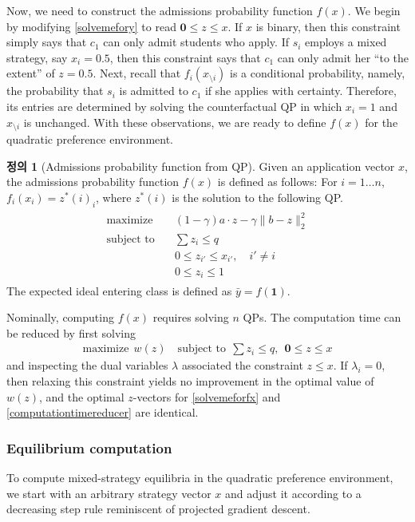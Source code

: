 \documentclass[12pt]{article} %
\theoremstyle{definition}
\newtheorem{definition}{Definition}
\theoremstyle{definition}
\newtheorem{definition}{정의}
\begin{document}
Now, we need to construct the admissions probability function $f(x)$. We begin by modifying \eqref{solvemefory} to read $\mathbf{0} \leq z \leq x$. If $x$ is binary, then this constraint simply says that $c_1$ can only admit students who apply. If $s_i$ employs a mixed strategy, say $x_i = 0.5$, then this constraint says that $c_1$ can only admit her ``to the extent'' of $z = 0.5$. Next, recall that $f_i(x_{\setminus i})$ is a conditional probability, namely, the probability that $s_i$ is admitted to $c_1$ if she applies with certainty. Therefore, its entries are determined by solving the counterfactual QP in which $x_i =1$ and $x_{\setminus i}$ is unchanged. With these observations, we are ready to define $f(x)$ for the quadratic preference environment.

\begin{definition}[Admissions probability function from QP]
Given an application vector $x$, the admissions probability function $f(x)$ is defined as follows: For $i = 1 \dots n$, $f_i(x_i) = z^*(i)_i$, where $z^*(i)$ is the solution to the following QP. 
\begin{align} \label{solvemeforfx}
\begin{split}
\text{maximize}\quad & (1 -\gamma) a \cdot z - \gamma \| b - z \|_2^2 \\
\text{subject to}\quad & \sum z_i \leq q \\
& 0 \leq z_{i'} \leq x_{i'}, \quad i' \neq i\\
& 0 \leq z_i \leq 1
\end{split}
\end{align}
The expected ideal entering class is defined as $\bar y = f(\mathbf{1})$. 
\end{definition}
Nominally, computing $f(x)$ requires solving $n$ QPs. The computation time can be reduced by first solving
\begin{align}\label{computationtimereducer}
\text{maximize}~~  w(z) \quad
\text{subject to}~~  \sum z_i \leq q , ~~\mathbf{0} \leq z \leq x
\end{align}
and inspecting the dual variables $\lambda$ associated the constraint $z \leq x$. If $\lambda_i = 0$, then relaxing this constraint yields no improvement in the optimal value of $w(z)$, and the optimal $z$-vectors for \eqref{solvemeforfx} and \eqref{computationtimereducer} are identical.

\subsubsection{Equilibrium computation}
To compute mixed-strategy equilibria in the quadratic preference environment, we start with an arbitrary strategy vector $x$ and adjust it according to a decreasing step rule reminiscent of projected gradient descent.
\end{document}
